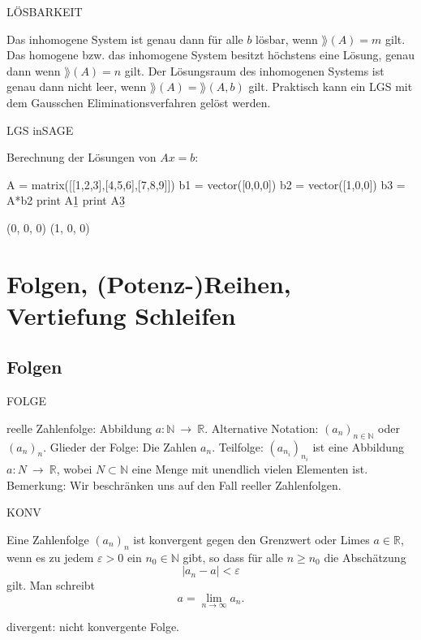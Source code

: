\documentclass[fontsize=12pt,paper=a4,twoside,bibtotoc,idxtotoc,
liststotoc,pagesize,BCOR1.2cm,DIV15,chapterprefix,pagesize=pdftex]{scrbook}
\theoremstyle{plain}
\theoremstyle{definition}
\theoremstyle{remark}
\begin{document}
LÖSBARKEIT


 Das inhomogene System ist genau dann für alle $b$
lösbar, wenn $\rang(A)=m$ gilt.
 Das homogene bzw. das inhomogene System besitzt höchstens eine
Lösung, genau dann wenn $\rang(A)=n$ gilt.
 Der Lösungsraum des inhomogenen Systems ist genau dann nicht
leer, wenn $\rang(A)=\rang(A, b)$ gilt. %
 Praktisch kann ein LGS mit dem {\color{red} Gausschen
Eliminationsverfahren} gelöst werden.


LGS inSAGE

Berechnung der Lösungen von $Ax=b$: 
\begin{sagein}
A = matrix([[1,2,3],[4,5,6],[7,8,9]])
b1 = vector([0,0,0])
b2 = vector([1,0,0])
b3 = A*b2
print A\b1
print A\b3
\end{sagein}
\begin{sage}
(0, 0, 0)
(1, 0, 0) 
\end{sage}


\chapter{Folgen, (Potenz-)Reihen, Vertiefung Schleifen}
\section{Folgen}

FOLGE


 {\color{red} reelle Zahlenfolge}: Abbildung $a:\mathbb{N} \ \rightarrow \ \mathbb{R}$.
 Alternative Notation: $(a_n)_{n \in \mathbb{N}}$ oder $(a_n)_{n}$.
 {\color{red} Glieder} der Folge: Die Zahlen $a_n$.
 {\color{red} Teilfolge}: $(a_{n_i})_{n_i}$ ist eine Abbildung $a:N \
\rightarrow \ \mathbb{R}$, wobei $N \subset \mathbb{N}$ eine Menge mit
unendlich vielen Elementen ist.
 Bemerkung: Wir beschränken uns auf den Fall reeller Zahlenfolgen. 


KONV

Eine Zahlenfolge $(a_n)_n$ ist {\color{red} konvergent} gegen den {\color{red}
Grenzwert} oder {\color{red} Limes} $a\in \mathbb{R}$, wenn es zu jedem
$\varepsilon >0$ ein $n_0 \in \mathbb{N}$ gibt, so dass für alle $n \geq
n_0$ die Abschätzung 
\[ |a_n - a|< \varepsilon \]
 gilt. Man schreibt
\[ a=\lim_{n \rightarrow \infty} a_n. \]

{\color{red} divergent}: nicht konvergente Folge. 
\end{document}
